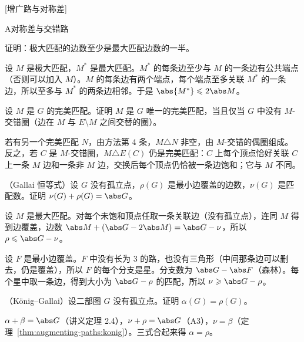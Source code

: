 [增广路与对称差]


\begin{exercises}{A}{对称差与交错路}
\item\label{ex:augmenting-paths:A1} 证明：极大匹配的边数至少是最大匹配边数的一半。
\begin{solution}
设 $M$ 是极大匹配，$M^*$ 是最大匹配。$M^*$ 的每条边至少与 $M$ 的一条边有公共端点（否则可以加入 $M$）。$M$ 的每条边有两个端点，每个端点至多关联 $M^*$ 的一条边，所以至多与 $M^*$ 的两条边相邻。于是 $\abs{M^*}\leqslant2\abs M$。
\end{solution}

\item\label{ex:augmenting-paths:A2} 设 $M$ 是 $G$ 的完美匹配。证明 $M$ 是 $G$ 唯一的完美匹配，当且仅当 $G$ 中没有 $M$-交错圈（边在 $M$ 与 $E\setminus M$ 之间交替的圈）。
\begin{solution}
若有另一个完美匹配 $N$，由方法第 4 条，$M\triangle N$ 非空，由 $M$-交错的偶圈组成。反之，若 $C$ 是 $M$-交错圈，$M\triangle E(C)$ 仍是完美匹配：$C$ 上每个顶点恰好关联 $C$ 上一条 $M$ 边和一条非 $M$ 边，交换后每个顶点仍恰被一条边饱和；它与 $M$ 不同。
\end{solution}

\item\label{ex:augmenting-paths:A3} （Gallai 恒等式）设 $G$ 没有孤立点，$\rho(G)$ 是最小边覆盖的边数，$\nu(G)$ 是匹配数。证明 $\nu(G)+\rho(G)=\abs G$。
\begin{solution}
设 $M$ 是最大匹配。对每个未饱和顶点任取一条关联边（没有孤立点），连同 $M$ 得到边覆盖，边数 $\abs M+(\abs G-2\abs M)=\abs G-\nu$，所以 $\rho\leqslant\abs G-\nu$。

设 $F$ 是最小边覆盖。$F$ 中没有长为 $3$ 的路，也没有三角形（中间那条边可以删去，仍是覆盖），所以 $F$ 的每个分支是星。分支数为 $\abs G-\abs F$（森林）。每个星中取一条边，得到大小为 $\abs G-\rho$ 的匹配，所以 $\nu\geqslant\abs G-\rho$。
\end{solution}

\item\label{ex:augmenting-paths:A4} （König--Gallai）设二部图 $G$ 没有孤立点。证明 $\alpha(G)=\rho(G)$。
\begin{solution}
$\alpha+\beta=\abs G$（讲义定理 2.4），$\nu+\rho=\abs G$（A3），$\nu=\beta$（定理~\ref{thm:augmenting-paths:konig}）。三式合起来得 $\alpha=\rho$。
\end{solution}
\end{exercises}
